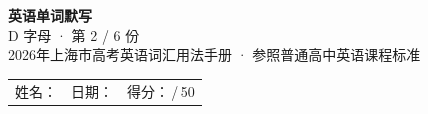 \documentclass[10pt,a4paper]{article}
\begin{document}
\pagestyle{plain}

\begin{center}
{\LARGE\bfseries 英语单词默写}\\[0.22em]
{\large D 字母 · 第 2 / 6 份}\\[0.18em]
{\small 2026年上海市高考英语词汇用法手册 · 参照普通高中英语课程标准}
\end{center}

\vspace{0.25em}
\noindent\begin{tabular}{@{}p{}@{}p{}@{}p{}@{}}
姓名：\underline{\hspace{2.0cm}} & 日期：\underline{\hspace{2.0cm}} & 得分：\underline{\hspace{1.3cm}}\,/\,50 \\
\end{tabular}

\vspace{0.3em}

\vspace{0.08em}
\end{document}
